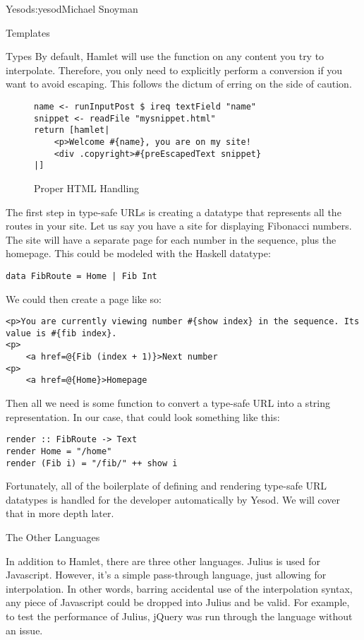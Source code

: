 \begin{aosachapter}{Yesod}{s:yesod}{Michael Snoyman}
\begin{aosasect1}{Templates}
\begin{aosasect2}{Types}
By default, Hamlet will use the  function on any
content you try to interpolate. Therefore, you only need to explicitly
perform a conversion if you want to avoid escaping. This follows the
dictum of erring on the side of caution.

\begin{figure}
\begin{verbatim}
name <- runInputPost $ ireq textField "name"
snippet <- readFile "mysnippet.html"
return [hamlet|
    <p>Welcome #{name}, you are on my site!
    <div .copyright>#{preEscapedText snippet}
|]
\end{verbatim}
\caption{Proper HTML Handling}
\label{fig.yesod.html}
\end{figure}

The first step in type-safe URLs is creating a datatype that
represents all the routes in your site. Let us say you have a site for
displaying Fibonacci numbers. The site will have a separate page for
each number in the sequence, plus the homepage. This could be modeled
with the Haskell datatype:

\begin{verbatim}
data FibRoute = Home | Fib Int
\end{verbatim}

We could then create a page like so:

\begin{verbatim}
<p>You are currently viewing number #{show index} in the sequence. Its value is #{fib index}.
<p>
    <a href=@{Fib (index + 1)}>Next number
<p>
    <a href=@{Home}>Homepage
\end{verbatim}

Then all we need is some function to convert a type-safe URL into a
string representation. In our case, that could look something like
this:

\begin{verbatim}
render :: FibRoute -> Text
render Home = "/home"
render (Fib i) = "/fib/" ++ show i
\end{verbatim}

Fortunately, all of the boilerplate of defining and rendering
type-safe URL datatypes is handled for the developer automatically by
Yesod. We will cover that in more depth later.

\end{aosasect2}

\begin{aosasect2}{The Other Languages}

In addition to Hamlet, there are three other languages. Julius is used
for Javascript. However, it's a simple pass-through language, just
allowing for interpolation. In other words, barring accidental use of
the interpolation syntax, any piece of Javascript could be dropped
into Julius and be valid. For example, to test the performance of
Julius, jQuery was run through the language without an issue.


\end{aosasect2}
\end{aosasect1}
\end{aosachapter}
